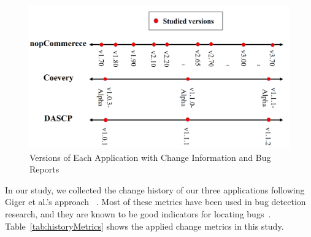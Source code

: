\begin{figure}[!ht]
	\centering
	\includegraphics[width=0.95\linewidth]{./Versions2.png}
	\vspace*{-7pt}
	\caption{Versions of Each Application with Change Information and Bug Reports}
	\label{fig:versions}
\end{figure}\textbf{}

In our study, we collected the change history of our three applications 
following Giger et al.'s approach ~\cite{method}. 
Most of these metrics have been used in bug detection research, and they
are known to be good indicators for locating bugs~\cite{sungmicro, shihab12, 
raimund, change1, change2, method}.
Table~\ref{tab:historyMetrics} shows the applied change metrics in this study. 

